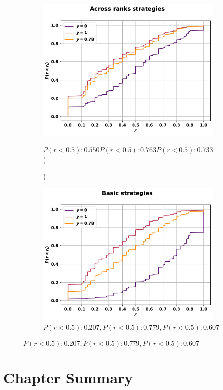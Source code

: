 \begin{figure}[!htbp]
\begin{subfigure}{.45\textwidth}
    \includegraphics[width=\textwidth]{src/chapters/07/img/cfd_to_probability_across_ranks_strategies.pdf}
    \caption(\(P(r<0.5): 0.550 P(r<0.5): 0.763 P(r<0.5): 0.733\))
    \end{subfigure}\hfill
    \begin{subfigure}{.45\textwidth}
    \includegraphics[width=\textwidth]{src/chapters/07/img/cfd_to_probability_basic_strategies.pdf}
    \caption{\(P(r<0.5): 0.207, P(r<0.5): 0.779, P(r<0.5): 0.607\)}
    \end{subfigure}
\end{figure}


\section{Chapter Summary}
